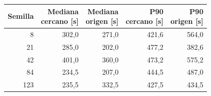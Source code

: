 \begin{tabular}{rrrrr}
\toprule
Semilla & \shortstack{Mediana\\cercano [s]} & \shortstack{Mediana\\origen [s]} & \shortstack{P90\\cercano [s]} & \shortstack{P90\\origen [s]} \\
\midrule
8 & 302,0 & 271,0 & 421,6 & 564,0 \\
21 & 285,0 & 202,0 & 477,2 & 382,6 \\
42 & 401,0 & 360,0 & 473,2 & 575,2 \\
84 & 234,5 & 207,0 & 444,5 & 487,0 \\
123 & 235,5 & 332,5 & 427,5 & 434,5 \\
\bottomrule
\end{tabular}
